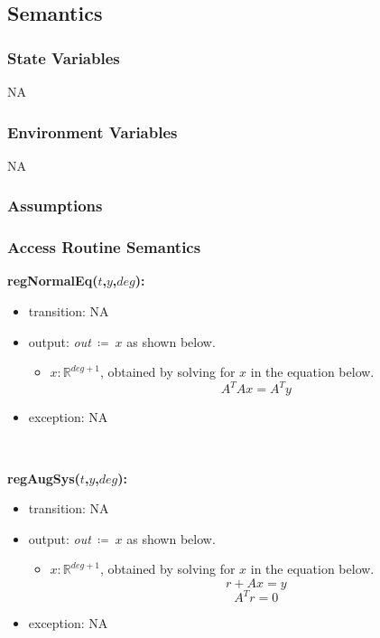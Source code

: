 \documentclass[12pt, titlepage]{article}
\begin{document}

\subsection{Semantics}

\subsubsection{State Variables} NA

\subsubsection{Environment Variables}

NA

\subsubsection{Assumptions}

\subsubsection{Access Routine Semantics}

\noindent \textbf{regNormalEq($t$,$y$,$deg$):}
\begin{itemize}
	\item transition: NA
	\item output: \textit{out}$\ \coloneqq\ x$ as shown below. 
	
	\begin{itemize}
		\item $x : \mathbb{R}^{deg+1}$, obtained by solving for $x$ in the 
		equation below.
		\begin{equation*}
		A^{T} Ax = A^{T}y
		\end{equation*}  
	\end{itemize} 
	\item exception: NA
\end{itemize}

~\newline


\noindent \textbf{regAugSys($t$,$y$,$deg$):}
\begin{itemize}
	\item transition: NA
	\item output: \textit{out}$\ \coloneqq\ x$ as shown below. 
	\begin{itemize}
		\item $x : \mathbb{R}^{deg+1}$, obtained by solving for $x$ in the 
		equation below.	
	\begin{equation*}
	r + Ax = y
	\end{equation*}
	\begin{equation*}
	A^{T} r = 0
	\end{equation*}
	\end{itemize}
	\item exception: NA
\end{itemize}
\end{document}
